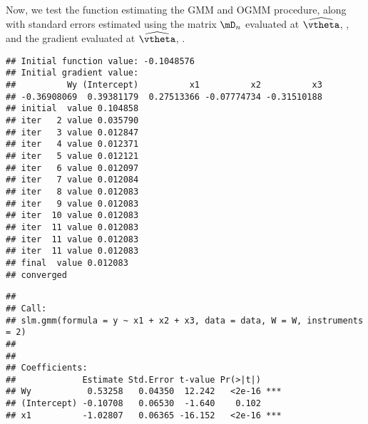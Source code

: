 \begin{knitrout}
\begin{kframe}
\begin{alltt}
  \hlstd{(}\hlstd{)}
  \hlopt{$}    \hlstd{=} \hlstd{,}  \hlstd{=} \hlstd{)}
  \hlstd{(}\hlstd{)}
\hlstd{\}}
\end{alltt}
\end{kframe}
\end{knitrout}

Now, we test the function  estimating the GMM and OGMM procedure, along with standard errors estimated using the matrix $\mD_n$ evaluated at $\widehat{\vtheta}$, , and the gradient evaluated at $\widehat{\vtheta}$, . 
\begin{knitrout}
\color{fgcolor}\begin{kframe}
\begin{alltt}
 \hlkwb{<-}  \hlopt{~}  \hlopt{+}  \hlopt{+}     \hlstd{=} \hlstd{,}  
\end{alltt}
\begin{verbatim}
## Initial function value: -0.1048576 
## Initial gradient value:
##          Wy (Intercept)          x1          x2          x3 
## -0.36908069  0.39381179  0.27513366 -0.07774734 -0.31510188 
## initial  value 0.104858 
## iter   2 value 0.035790
## iter   3 value 0.012847
## iter   4 value 0.012371
## iter   5 value 0.012121
## iter   6 value 0.012097
## iter   7 value 0.012084
## iter   8 value 0.012083
## iter   9 value 0.012083
## iter  10 value 0.012083
## iter  11 value 0.012083
## iter  11 value 0.012083
## iter  11 value 0.012083
## final  value 0.012083 
## converged
\end{verbatim}
\begin{alltt}
  \hlstd{=} \hlstd{)}
\end{alltt}
\begin{verbatim}
## 
## Call:
## slm.gmm(formula = y ~ x1 + x2 + x3, data = data, W = W, instruments = 2)
## 
## 
## Coefficients:
##             Estimate Std.Error t-value Pr(>|t|)    
## Wy           0.53258   0.04350  12.242   <2e-16 ***
## (Intercept) -0.10708   0.06530  -1.640    0.102    
## x1          -1.02807   0.06365 -16.152   <2e-16 ***

\end{verbatim}
\end{kframe}
\end{knitrout}
